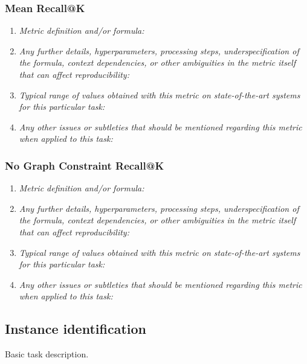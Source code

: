 \documentclass[a4paper,11pt]{article}
\begin{document}
        \subsubsection{Mean Recall@K}
            \begin{enumerate}[label=\alph*.]
                \item \textit{Metric definition and/or formula:}
                \bigskip
                \item \textit{Any further details, hyperparameters, processing steps, underspecification of the formula, context dependencies, or other ambiguities in the metric itself that can affect reproducibility:}
                \bigskip
                \item \textit{Typical range of values obtained with this metric on state-of-the-art systems for this particular task:}
                \bigskip
                \item \textit{Any other issues or subtleties that should be mentioned regarding this metric when applied to this task:}
                \bigskip
            \end{enumerate}
        \subsubsection{No Graph Constraint Recall@K}
            \begin{enumerate}[label=\alph*.]
                \item \textit{Metric definition and/or formula:}
                \bigskip
                \item \textit{Any further details, hyperparameters, processing steps, underspecification of the formula, context dependencies, or other ambiguities in the metric itself that can affect reproducibility:}
                \bigskip
                \item \textit{Typical range of values obtained with this metric on state-of-the-art systems for this particular task:}
                \bigskip
                \item \textit{Any other issues or subtleties that should be mentioned regarding this metric when applied to this task:}
                \bigskip
            \end{enumerate}

    \subsection{Instance identification}
        Basic task description.
\end{document}

